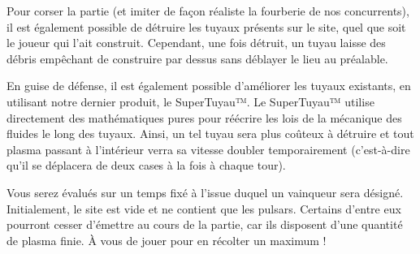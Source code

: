 Pour corser la partie (et imiter de façon réaliste la fourberie de nos
concurrents), il est également possible de détruire les tuyaux présents sur le
site, quel que soit le joueur qui l'ait construit. Cependant, une fois détruit,
un tuyau laisse des débris empêchant de construire par dessus sans déblayer le
lieu au préalable.

En guise de défense, il est également possible d'améliorer les tuyaux
existants, en utilisant notre dernier produit, le SuperTuyau™. Le SuperTuyau™
utilise directement des mathématiques pures pour réécrire les lois de la
mécanique des fluides le long des tuyaux. Ainsi, un tel tuyau
sera plus coûteux à détruire et tout plasma passant à l'intérieur
verra sa vitesse doubler temporairement (c'est-à-dire qu'il se déplacera
de deux cases à la fois à chaque tour).

Vous serez évalués sur un temps fixé à l'issue duquel un vainqueur sera
désigné. Initialement, le site est vide et ne contient que les pulsars.
Certains d'entre eux pourront cesser d'émettre au cours de la partie, car ils
disposent d'une quantité de plasma finie. À vous de jouer pour en récolter un
maximum !
